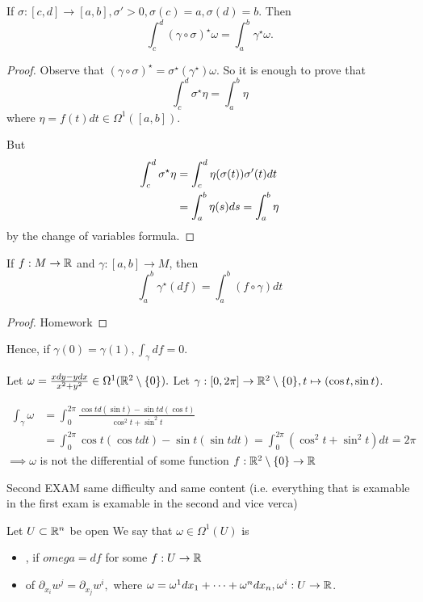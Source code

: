 \begin{lemma}\label{lem:10.3}
    If \(\sigma:[c,d]\to[a,b],\sigma'>0,\sigma(c)=a,\sigma(d)=b\). Then \[\int_c^d (\gamma\circ \sigma)^\star \omega= \int_a^b\gamma^\star \omega.\]
\end{lemma}

\begin{proof}
    Observe that \((\gamma\circ \sigma)^\star=\sigma^\star(\gamma^\star)\omega\). So it is enough to 
    prove that \[\int_c^d \sigma^\star \eta=\int_a^b \eta\]
    where \(\eta=f(t)dt\in\Omega^1([a,b])\).

    But \begin{align*}
        \int_c^d\sigma^\star \eta & =\int_c^d \eta(\sigma(t))\sigma'(t)dt\\
        &=\int_a^b\eta(s)ds = \int_a^b \eta \qedhere
    \end{align*}
    by the change of variables formula.
\end{proof}

\begin{lemma}\label{lem:10.4}
    If \(f:M\to\mathbb{R}\) and \(\gamma:[a,b]\to M\), then  
    \[\int_a^b\gamma^\star (df)=\int_a^b (f\circ \gamma)dt\]
\end{lemma}

\begin{proof}
    Homework
\end{proof}

Hence, if \(\gamma(0)=\gamma(1), \int_\gamma df=0.\)

\begin{example}
    Let \(\omega=\frac{xdy-ydx}{x^2+y^2}\in \Omega^1(\mathbb{R}^2\setminus\{0\}).\) Let \(\gamma:[0,2\pi]\to\mathbb{R}^2\setminus \{0\},t\mapsto (\cos t,\sin t)\).

    \begin{align*}
        \int_\gamma \omega&=\int_0^{2\pi} \frac{\cos t d(\sin t)-\sin t d(\cos t)}{\cos^2 t+\sin^2 t}\\ 
        &=\int_0^{2\pi} \cos t (\cos t dt)- \sin t (\sin t dt)=\int_0^{2\pi} (\cos^2 t +\sin^2 t)dt=2\pi
    \end{align*}
    \(\implies \omega\) is not the differential of some function \(f:\mathbb{R}^2\setminus\{0\}\to \mathbb{R}\)
\end{example}

Second EXAM same difficulty and same  content (i.e. everything that is examable in the first exam is examable in the second and vice verca)

\begin{definition*}
    Let \(U\subset \mathbb{R}^n\) be open  We say that \(\omega\in \Omega^1(U)\) is 
    \begin{itemize}
        \item {}, if \(omega=df\) for some \(f:U\to \mathbb{R}\)
        \item {} of \(\partial_{x_i}w^j=\partial_{x_j}w^i,\) where \(\omega=\omega^1 dx_1+\dots+\omega^ndx_n,\omega^i:U\to\mathbb{R}\).
    \end{itemize}
\end{definition*}

